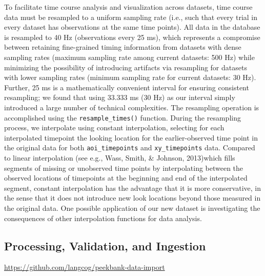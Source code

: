 \documentclass[
  english,
  man,floatsintext]{apa6}
\providecommand{\DIFaddtex}[1]{{\protect\color{blue}{#1}}} %
\providecommand{\DIFdeltex}[1]{}                      %
\providecommand{\DIFaddbegin}{} %
\providecommand{\DIFaddend}{} %
\providecommand{\DIFdelbegin}{} %
\providecommand{\DIFdelend}{} %
\providecommand{\DIFadd}[1]{\texorpdfstring{\DIFaddtex{#1}}{#1}} %
\providecommand{\DIFdel}[1]{\texorpdfstring{\DIFdeltex{#1}}{}} %
\newcommand{\DIFscaledelfig}{0.5}
\newlength{\DIFdelgraphicswidth} %
\newlength{\DIFdelgraphicsheight} %
\newcommand{\DIFaddincludegraphics}[2][]{{\color{blue}\fbox{\DIFOincludegraphics[#1]{#2}}}} %
\newcommand{\DIFdelincludegraphics}[2][]{%
\sbox{\DIFdelgraphicsbox}{\DIFOincludegraphics[#1]{#2}}%
\settoboxwidth{\DIFdelgraphicswidth}{\DIFdelgraphicsbox} %
\settoboxtotalheight{\DIFdelgraphicsheight}{\DIFdelgraphicsbox} %
\scalebox{\DIFscaledelfig}{%
\parbox[b]{\DIFdelgraphicswidth}{\usebox{\DIFdelgraphicsbox}\\[-\baselineskip] \rule{\DIFdelgraphicswidth}{0em}}\llap{\resizebox{\DIFdelgraphicswidth}{\DIFdelgraphicsheight}{%
\setlength{\unitlength}{\DIFdelgraphicswidth}%
\begin{picture}(1,1)%
\thicklines\linethickness{2pt} %
{\color[rgb]{1,0,0}\put(0,0){\framebox(1,1){}}}%
{\color[rgb]{1,0,0}\put(0,0){\line( 1,1){1}}}%
{\color[rgb]{1,0,0}\put(0,1){\line(1,-1){1}}}%
\end{picture}%
}\hspace*{3pt}}} %
} %
\DeclareRobustCommand{\DIFaddbegin}{\DIFOaddbegin \let\includegraphics\DIFaddincludegraphics} %
\DeclareRobustCommand{\DIFaddend}{\DIFOaddend \let\includegraphics\DIFOincludegraphics} %
\DeclareRobustCommand{\DIFdelbegin}{\DIFOdelbegin \let\includegraphics\DIFdelincludegraphics} %
\DeclareRobustCommand{\DIFdelend}{\DIFOaddend \let\includegraphics\DIFOincludegraphics} %
\begin{document}
To facilitate time course analysis and visualization across datasets, time course data must be resampled to a uniform sampling rate (i.e., such that every trial in every dataset has observations at the same time points).
All data in the database is resampled to 40 Hz (observations every 25 ms), which represents a compromise between retaining fine-grained timing information from datasets with dense sampling rates (maximum sampling rate among current datasets: 500 Hz) while minimizing the possibility of introducing artifacts via resampling for datasets with lower sampling rates (minimum sampling rate for current datasets: 30 Hz).
Further, 25 ms is a mathematically convenient interval for ensuring consistent resampling; we found that using 33.333 ms (30 Hz) as our interval simply introduced a large number of technical complexities.
The resampling operation is accomplished using the \texttt{resample\_times()} function.
During the resampling process, we interpolate using constant interpolation, selecting for each interpolated timepoint the looking location for the earlier-observed time point in the original data for both \texttt{aoi\_timepoints} and \texttt{xy\_timepoints} data.
Compared to linear interpolation (see e.g., Wass, Smith, \& Johnson, 2013)\DIFdelbegin \DIFdel{-- }\DIFdelend \DIFaddbegin \DIFadd{, }\DIFaddend which fills segments of missing or unobserved time points by interpolating between the observed locations of timepoints at the beginning and end of the interpolated segment\DIFdelbegin \DIFdel{--}\DIFdelend , constant interpolation has the advantage that it is more conservative, in the sense that it does not introduce new look locations beyond those measured in the original data.
One possible application of our new dataset is investigating the consequences of other interpolation functions for data analysis.

\hypertarget{processing-validation-and-ingestion}{%
\subsection{Processing, Validation, and Ingestion}\label{processing-validation-and-ingestion}}

\DIFaddbegin \DIFadd{Although Peekbank provides a common data format, the key hurdle to populating the database is converting existing datasets to this format.
Each dataset is imported via a custom import script, which documents the process of conversion.
Often various decisions must be made in this import process (for example, how to characterize a particular trial type within the options available in the Peekbank schema); these scripts provide a reproducible record of this decision-making process. Our data import repository (available on GitHub at }\url{https://github.com/langcog/peekbank-data-import}\DIFadd{) contains all of these scripts, links to internal documentation on data import, and a set of generic import templates for different formats.
}
\end{document}
